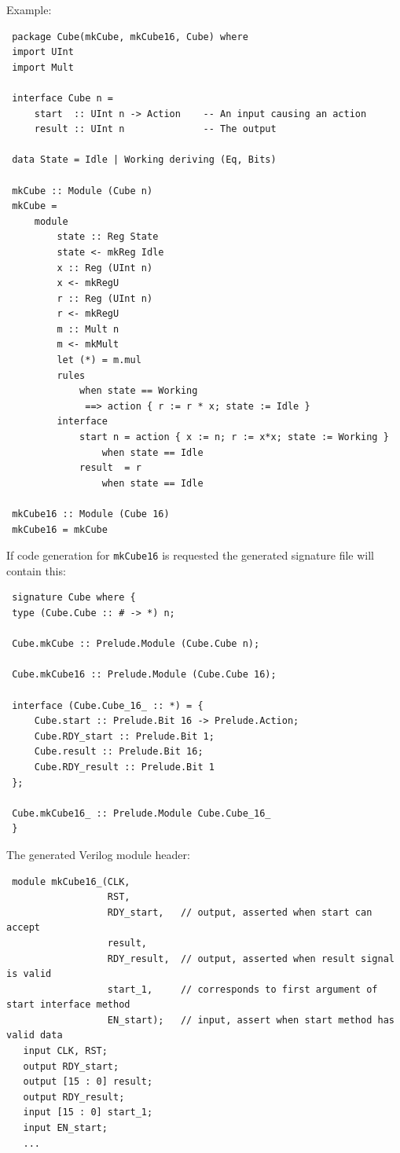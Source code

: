 \documentclass[twoside,letterpaper]{article}
\newcommand{\veri}{Verilog}
\newcommand{\te}[1]{\texttt{#1}}
\begin{document}
Example:
\begin{verbatim}
 package Cube(mkCube, mkCube16, Cube) where
 import UInt
 import Mult

 interface Cube n =
     start  :: UInt n -> Action    -- An input causing an action
     result :: UInt n              -- The output

 data State = Idle | Working deriving (Eq, Bits)

 mkCube :: Module (Cube n)
 mkCube =
     module
         state :: Reg State
         state <- mkReg Idle
         x :: Reg (UInt n)
         x <- mkRegU
         r :: Reg (UInt n)
         r <- mkRegU
         m :: Mult n
         m <- mkMult
         let (*) = m.mul
         rules
             when state == Working
              ==> action { r := r * x; state := Idle }
         interface
             start n = action { x := n; r := x*x; state := Working }
                 when state == Idle
             result  = r
                 when state == Idle

 mkCube16 :: Module (Cube 16)
 mkCube16 = mkCube
\end{verbatim}

If code generation for \te{mkCube16} is requested the generated signature file
will contain this:
\begin{verbatim}
 signature Cube where {
 type (Cube.Cube :: # -> *) n;

 Cube.mkCube :: Prelude.Module (Cube.Cube n);

 Cube.mkCube16 :: Prelude.Module (Cube.Cube 16);

 interface (Cube.Cube_16_ :: *) = {
     Cube.start :: Prelude.Bit 16 -> Prelude.Action;
     Cube.RDY_start :: Prelude.Bit 1;
     Cube.result :: Prelude.Bit 16;
     Cube.RDY_result :: Prelude.Bit 1
 };

 Cube.mkCube16_ :: Prelude.Module Cube.Cube_16_
 }
\end{verbatim}

The generated {\veri} module header:
\begin{verbatim}
 module mkCube16_(CLK,
                  RST,
                  RDY_start,   // output, asserted when start can accept
                  result,
                  RDY_result,  // output, asserted when result signal is valid
                  start_1,     // corresponds to first argument of start interface method
                  EN_start);   // input, assert when start method has valid data
   input CLK, RST;
   output RDY_start;
   output [15 : 0] result;
   output RDY_result;
   input [15 : 0] start_1;
   input EN_start;
   ...
\end{verbatim}
\end{document}
